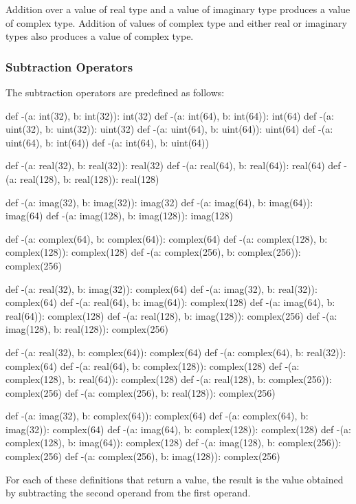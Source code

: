 Addition over a value of real type and a value of imaginary type
produces a value of complex type.  Addition of values of complex type
and either real or imaginary types also produces a value of complex
type.

\subsubsection{Subtraction Operators}
\label{Subtraction_Operators}

The subtraction operators are predefined as follows:
\begin{chapel}
def -(a: int(32), b: int(32)): int(32)
def -(a: int(64), b: int(64)): int(64)
def -(a: uint(32), b: uint(32)): uint(32)
def -(a: uint(64), b: uint(64)): uint(64)
def -(a: uint(64), b: int(64))
def -(a: int(64), b: uint(64))

def -(a: real(32), b: real(32)): real(32)
def -(a: real(64), b: real(64)): real(64)
def -(a: real(128), b: real(128)): real(128)

def -(a: imag(32), b: imag(32)): imag(32)
def -(a: imag(64), b: imag(64)): imag(64)
def -(a: imag(128), b: imag(128)): imag(128)

def -(a: complex(64), b: complex(64)): complex(64)
def -(a: complex(128), b: complex(128)): complex(128)
def -(a: complex(256), b: complex(256)): complex(256)

def -(a: real(32), b: imag(32)): complex(64)
def -(a: imag(32), b: real(32)): complex(64)
def -(a: real(64), b: imag(64)): complex(128)
def -(a: imag(64), b: real(64)): complex(128)
def -(a: real(128), b: imag(128)): complex(256)
def -(a: imag(128), b: real(128)): complex(256)

def -(a: real(32), b: complex(64)): complex(64)
def -(a: complex(64), b: real(32)): complex(64)
def -(a: real(64), b: complex(128)): complex(128)
def -(a: complex(128), b: real(64)): complex(128)
def -(a: real(128), b: complex(256)): complex(256)
def -(a: complex(256), b: real(128)): complex(256)

def -(a: imag(32), b: complex(64)): complex(64)
def -(a: complex(64), b: imag(32)): complex(64)
def -(a: imag(64), b: complex(128)): complex(128)
def -(a: complex(128), b: imag(64)): complex(128)
def -(a: imag(128), b: complex(256)): complex(256)
def -(a: complex(256), b: imag(128)): complex(256)
\end{chapel}
For each of these definitions that return a value, the result is the
value obtained by subtracting the second operand from the first
operand.

